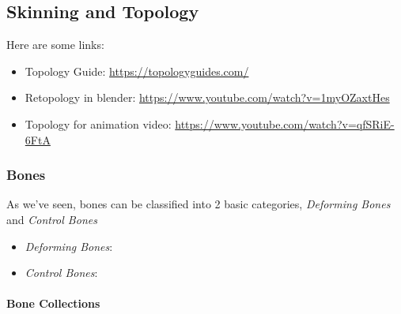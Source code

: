 \documentclass{article}
\begin{document}
\subsection{Skinning and Topology}
Here are some links:
\begin{itemize}[noitemsep, topsep=0pt]
    \item Topology Guide: \href{https://topologyguides.com/}{https://topologyguides.com/}
    \item Retopology in blender: \href{https://www.youtube.com/watch?v=1myOZaxtHes}{https://www.youtube.com/watch?v=1myOZaxtHes}
    \item Topology for animation video: \href{https://www.youtube.com/watch?v=qfSRiE-6FtA}{https://www.youtube.com/watch?v=qfSRiE-6FtA}
\end{itemize}

\subsubsection{Bones}
As we've seen, bones can be classified into 2 basic categories, \textit{Deforming Bones} and \textit{Control Bones}
\begin{itemize}[noitemsep, topsep=0pt]
    \item \textit{Deforming Bones}:
    \item \textit{Control Bones}:
\end{itemize}

\paragraph{Bone Collections}
\end{document}
